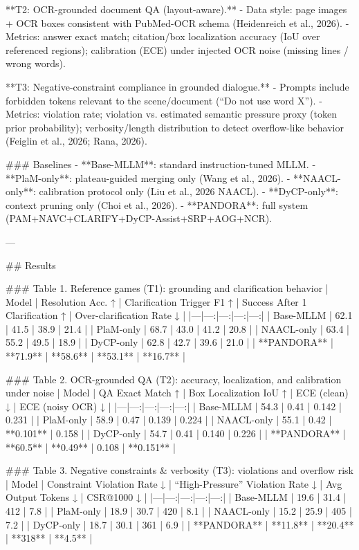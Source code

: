 **T2: OCR-grounded document QA (layout-aware).**  
- Data style: page images + OCR boxes consistent with PubMed-OCR schema (Heidenreich et al., 2026).  
- Metrics: answer exact match; citation/box localization accuracy (IoU over referenced regions); calibration (ECE) under injected OCR noise (missing lines / wrong words).

**T3: Negative-constraint compliance in grounded dialogue.**  
- Prompts include forbidden tokens relevant to the scene/document (“Do not use word X”).  
- Metrics: violation rate; violation vs. estimated semantic pressure proxy (token prior probability); verbosity/length distribution to detect overflow-like behavior (Feiglin et al., 2026; Rana, 2026).

### Baselines  
- **Base-MLLM**: standard instruction-tuned MLLM.  
- **PlaM-only**: plateau-guided merging only (Wang et al., 2026).  
- **NAACL-only**: calibration protocol only (Liu et al., 2026 NAACL).  
- **DyCP-only**: context pruning only (Choi et al., 2026).  
- **PANDORA**: full system (PAM+NAVC+CLARIFY+DyCP-Assist+SRP+AOG+NCR).

---

## Results  

### Table 1. Reference games (T1): grounding and clarification behavior  
| Model | Resolution Acc. ↑ | Clarification Trigger F1 ↑ | Success After 1 Clarification ↑ | Over-clarification Rate ↓ |
|---|---:|---:|---:|---:|
| Base-MLLM | 62.1 | 41.5 | 38.9 | 21.4 |
| PlaM-only | 68.7 | 43.0 | 41.2 | 20.8 |
| NAACL-only | 63.4 | 55.2 | 49.5 | 18.9 |
| DyCP-only | 62.8 | 42.7 | 39.6 | 21.0 |
| **PANDORA** | **71.9** | **58.6** | **53.1** | **16.7** |

### Table 2. OCR-grounded QA (T2): accuracy, localization, and calibration under noise  
| Model | QA Exact Match ↑ | Box Localization IoU ↑ | ECE (clean) ↓ | ECE (noisy OCR) ↓ |
|---|---:|---:|---:|---:|
| Base-MLLM | 54.3 | 0.41 | 0.142 | 0.231 |
| PlaM-only | 58.9 | 0.47 | 0.139 | 0.224 |
| NAACL-only | 55.1 | 0.42 | **0.101** | 0.158 |
| DyCP-only | 54.7 | 0.41 | 0.140 | 0.226 |
| **PANDORA** | **60.5** | **0.49** | 0.108 | **0.151** |

### Table 3. Negative constraints & verbosity (T3): violations and overflow risk  
| Model | Constraint Violation Rate ↓ | “High-Pressure” Violation Rate ↓ | Avg Output Tokens ↓ | CSR@1000 ↓ |
|---|---:|---:|---:|---:|
| Base-MLLM | 19.6 | 31.4 | 412 | 7.8 |
| PlaM-only | 18.9 | 30.7 | 420 | 8.1 |
| NAACL-only | 15.2 | 25.9 | 405 | 7.2 |
| DyCP-only | 18.7 | 30.1 | 361 | 6.9 |
| **PANDORA** | **11.8** | **20.4** | **318** | **4.5** |

